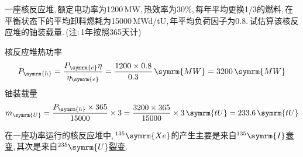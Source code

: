 \begin{exercise}
    一座核反应堆,\,额定电功率为1200\,MW,\,热效率为30\%,\,每年平均更换1/3的燃料,\,在平衡状态下的平均卸料燃耗为15000\,MWd/tU,\,年平均负荷因子为0.8.\,试估算该核反应堆的铀装载量.\,(注:\,1年按照365天计)
    \begin{solution}
        核反应堆热功率
        \begin{equation*}
            P_{\symrm{h}} = \frac{P_{\symrm{e}}\eta}{\eta_{\symrm{e}}} = \frac{1200 \times 0.8}{0.3}\,\symrm{MW} = 3200\,\symrm{MW}
        \end{equation*}
        铀装载量
        \begin{equation*}
            m_{\symrm{U}} = \frac{P_{\symrm{h}} \times 365}{15000} \times 3 = \frac{3200 \times 365}{15000} \times 3\,\symrm{tU} = 233.6\,\symrm{tU}
        \end{equation*}
    \end{solution}
\end{exercise}

\begin{exercise}
    在一座功率运行的核反应堆中,\,${}^{135}\symrm{Xe}$的产生主要是来自\underline{{\kaishu ${}^{135}\symrm{I}$衰变}},\,其次是来自\underline{{\kaishu ${}^{235}\symrm{U}$裂变}}.\,
\end{exercise}

